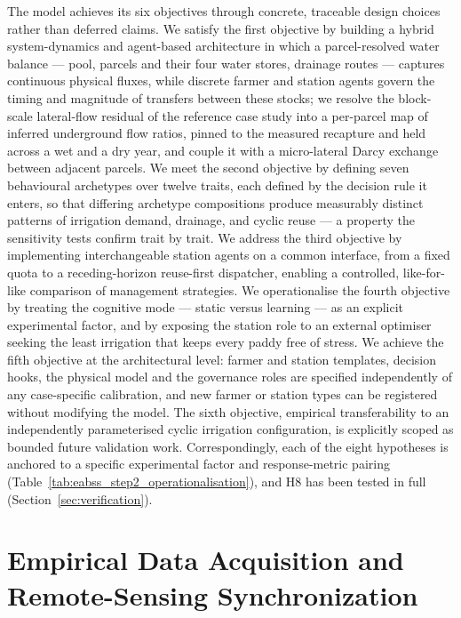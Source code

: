 \documentclass{article}
\begin{document}
\begin{changed}
\raggedright
\medskip
The model achieves its six objectives through concrete, traceable design choices rather than deferred claims. We satisfy the first objective by building a hybrid system-dynamics and agent-based architecture in which a parcel-resolved water balance --- pool, parcels and their four water stores, drainage routes --- captures continuous physical fluxes, while discrete farmer and station agents govern the timing and magnitude of transfers between these stocks; we resolve the block-scale lateral-flow residual of the reference case study into a per-parcel map of inferred underground flow ratios, pinned to the measured recapture and held across a wet and a dry year, and couple it with a micro-lateral Darcy exchange between adjacent parcels. We meet the second objective by defining seven behavioural archetypes over twelve traits, each defined by the decision rule it enters, so that differing archetype compositions produce measurably distinct patterns of irrigation demand, drainage, and cyclic reuse --- a property the sensitivity tests confirm trait by trait. We address the third objective by implementing interchangeable station agents on a common interface, from a fixed quota to a receding-horizon reuse-first dispatcher, enabling a controlled, like-for-like comparison of management strategies. We operationalise the fourth objective by treating the cognitive mode --- static versus learning --- as an explicit experimental factor, and by exposing the station role to an external optimiser seeking the least irrigation that keeps every paddy free of stress. We achieve the fifth objective at the architectural level: farmer and station templates, decision hooks, the physical model and the governance roles are specified independently of any case-specific calibration, and new farmer or station types can be registered without modifying the model. The sixth objective, empirical transferability to an independently parameterised cyclic irrigation configuration, is explicitly scoped as bounded future validation work. Correspondingly, each of the eight hypotheses is anchored to a specific experimental factor and response-metric pairing (Table~\ref{tab:eabss_step2_operationalisation}), and H8 has been tested in full (Section~\ref{sec:verification}).
\end{changed}

\section{Empirical Data Acquisition and Remote-Sensing Synchronization}
\end{document}
